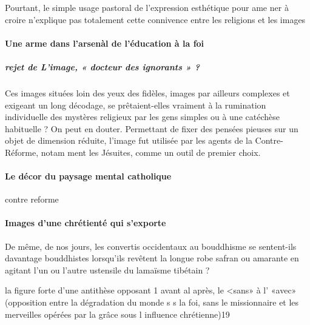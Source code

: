 Pourtant, le simple usage pastoral de l'expression esthétique pour ame­ ner à croire n'explique pas totalement cette connivence entre les religions et les images


\paragraph{
Une arme dans l'arsenàl de l'éducation à la foi
}

\subparagraph{rejet de L'image, « docteur des ignorants » ? }

Ces images situées loin des yeux des fidèles, images par ailleurs complexes et exigeant un long décodage, se prêtaient-elles vraiment à la rumination individuelle des mystères religieux par les gens simples ou à une catéchèse habituelle ? On peut en douter. 
Permettant de fixer des pensées pieuses sur un objet de dimension réduite, l'image fut utilisée par les agents de la Contre-Réforme, notam­ ment les Jésuites, comme un outil de premier choix. 


\paragraph{Le décor du paysage mental catholique} contre reforme

\paragraph{Images d'une chrétienté qui s'exporte
}
De même, de nos jours, les convertis occidentaux au bouddhisme se sentent-ils davantage bouddhistes lorsqu'ils revêtent la longue robe safran ou amarante en agitant l'un ou l'autre ustensile du lamaïsme tibétain ? 

la figure forte d'une antithèse opposant
1 avant al après, le <sans» à l' «avec» (opposition entre la dégradation du monde s s la foi, sans le missionnaire et les merveilles opérées par la grâce sous l influence chrétienne)19


